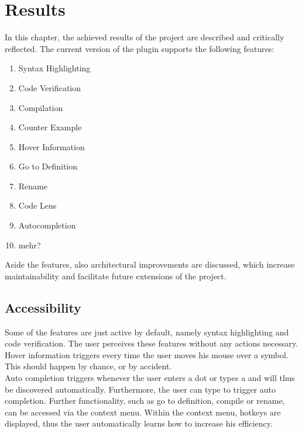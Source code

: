 \section{Results}
\label{section:results}
In this chapter, the achieved results of the project are described and critically reflected.
The current version of the plugin supports the following features:
\begin{enumerate}
    \item Syntax Highlighting
    \item Code Verification
    \item Compilation
    \item Counter Example
    \item Hover Information
    \item Go to Definition
    \item Rename
    \item Code Lens
    \item Autocompletion
    \item mehr?
\end{enumerate}

Aside the features, also architectural improvements are discussed,
which increase maintainability and facilitate future extensions of the project.


\subsection{Accessibility}
Some of the features are just active by default, namely syntax highlighting and code verification.
The user perceives these features without any actions necessary.\\

Hover information triggers every time the user moves his mouse over a symbol.
This should happen by chance, or by accident.\\

Auto completion triggers whenever the user enters a dot or types a  and will thus be discovered automatically. 
Furthermore, the user can type  to trigger auto completion.
Further functionality, such as go to definition, compile or rename, can be accessed via the context menu.
Within the context menu, hotkeys are displayed, thus the user automatically learns how to increase his efficiency.

